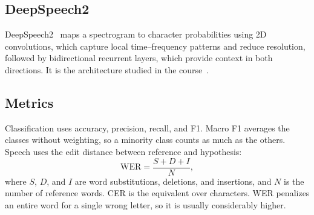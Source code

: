 \subsection{DeepSpeech2}
DeepSpeech2~\cite{ds2} maps a spectrogram to character probabilities using 2D convolutions, which capture local time--frequency patterns and reduce resolution, followed by bidirectional recurrent layers, which provide context in both directions. It is the architecture studied in the course~\cite{keras-ctc}.

\subsection{Metrics}
Classification uses accuracy, precision, recall, and F1. Macro F1 averages the classes without weighting, so a minority class counts as much as the others. Speech uses the edit distance between reference and hypothesis:
\begin{equation}
\mathrm{WER}=\frac{S+D+I}{N},
\end{equation}
where $S$, $D$, and $I$ are word substitutions, deletions, and insertions, and $N$ is the number of reference words. CER is the equivalent over characters. WER penalizes an entire word for a single wrong letter, so it is usually considerably higher.
